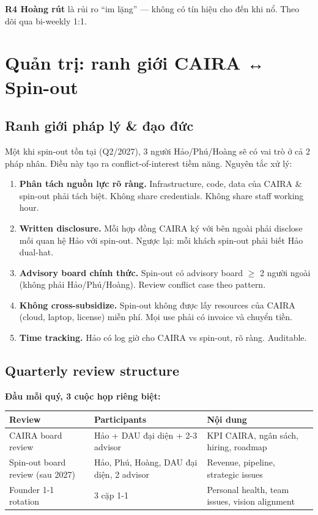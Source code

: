 \documentclass[11pt,a4paper]{article}
\begin{document}
\textbf{R4 Hoàng rút} là rủi ro ``im lặng'' --- không có tín hiệu cho đến khi
nổ. Theo dõi qua bi-weekly 1:1.

\clearpage

\section{Quản trị: ranh giới CAIRA ↔ Spin-out}

\subsection{Ranh giới pháp lý \& đạo đức}

Một khi spin-out tồn tại (Q2/2027), 3 người Hảo/Phú/Hoàng sẽ có vai trò ở cả 2
pháp nhân. Điều này tạo ra conflict-of-interest tiềm năng. Nguyên tắc xử lý:

\begin{enumerate}
\item \textbf{Phân tách nguồn lực rõ ràng.} Infrastructure, code, data của CAIRA \& spin-out phải tách biệt. Không share credentials. Không share staff working hour.
\item \textbf{Written disclosure.} Mỗi hợp đồng CAIRA ký với bên ngoài phải disclose mối quan hệ Hảo với spin-out. Ngược lại: mỗi khách spin-out phải biết Hảo dual-hat.
\item \textbf{Advisory board chính thức.} Spin-out có advisory board $\geq$ 2 người ngoài (không phải Hảo/Phú/Hoàng). Review conflict case theo pattern.
\item \textbf{Không cross-subsidize.} Spin-out không được lấy resources của CAIRA (cloud, laptop, license) miễn phí. Mọi use phải có invoice và chuyển tiền.
\item \textbf{Time tracking.} Hảo có log giờ cho CAIRA vs spin-out, rõ ràng. Auditable.
\end{enumerate}

\subsection{Quarterly review structure}

\textbf{Đầu mỗi quý, 3 cuộc họp riêng biệt:}

\begin{tabularx}{\linewidth}{@{}p{3cm} p{2.5cm} X@{}}
\toprule
\textbf{Review} & \textbf{Participants} & \textbf{Nội dung} \\
\midrule
CAIRA board review & Hảo + DAU đại diện + 2-3 advisor & KPI CAIRA, ngân sách, hiring, roadmap \\
Spin-out board review (sau 2027) & Hảo, Phú, Hoàng, DAU đại diện, 2 advisor & Revenue, pipeline, strategic issues \\
Founder 1-1 rotation & 3 cặp 1-1 & Personal health, team issues, vision alignment \\
\bottomrule
\end{tabularx}
\end{document}
